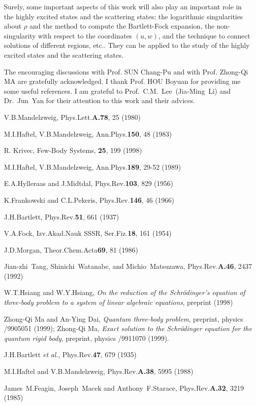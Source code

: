 Surely, some important aspects of this work will also play an important
role in the highly excited states and the scattering states: the logarithmic
singularities about $\rho$ and the method to compute the Bartlett-Fock expansion,
the non-singularity with respect to the coordinates $(u,w)$, and the technique
to connect solutions of different regions, etc.. They can be applied
to the study of the highly excited states and the scattering states.

\vspace{5mm}

\noindent The encouraging discussions with Prof. SUN Chang-Pu and with
Prof. Zhong-Qi MA are gratefully
acknowledged. I thank Prof. HOU Boyuan for providing me some useful references.
I am grateful to Prof.~C.M.~Lee~(Jia-Ming~Li) and Dr.~Jun~Yan for
their attention to this work and their advices.

\begin{thebibliography}{99}

 V.B.Mandelzweig, Phys.Lett.{\bf A.78}, 25 (1980)

 M.I.Haftel, V.B.Mandelzweig, Ann.Phys.{\bf 150}, 48 (1983)

 R. Krivec, Few-Body Systems, {\bf 25}, 199 (1998)

 M.I.Haftel, V.B.Mandelzweig, Ann.Phys.{\bf 189}, 29-52 (1989)

 E.A.Hylleraas and J.Midtdal, Phys.Rev.{\bf 103}, 829 (1956)

 K.Frankowski and C.L.Pekeris, Phys.Rev.{\bf 146}, 46 (1966)

 J.H.Bartlett, Phys.Rev.{\bf 51}, 661 (1937)

 V.A.Fock, Izv.Akad.Nauk SSSR, Ser.Fiz.{\bf 18}, 161 (1954)

 J.D.Morgan, Theor.Chem.Acta{\bf 69}, 81 (1986)

 Jian-zhi~Tang, Shinichi~Watanabe, and Michio~Matsuzawa,
Phys.Rev.{\bf A.46}, 2437 (1992)

 W.T.Hsiang and W.Y.Hsiang, {\it On the reduction of the
Schr\"{o}dinger's equation of three-body problem to a system of linear
algebraic equations}, preprint (1998)

 Zhong-Qi Ma and An-Ying Dai, {\it Quantum three-body problem},
preprint, physics /9905051 (1999); Zhong-Qi Ma, {\it Exact solution to the
Schr\"{o}dinger equation for the quantum rigid body},
preprint, physics /9911070 (1999).

 J.H.Bartlett {\it et al.}, Phys.Rev.{\bf 47}, 679 (1935)

 M.I.Haftel and V.B.Mandelzweig, Phys.Rev.{\bf A.38}, 5995 (1988)

 James~M.Feagin, Joseph~Macek and Anthony~F.Starace,
Phys.Rev.{\bf A.32}, 3219 (1985)
\end{thebibliography}



